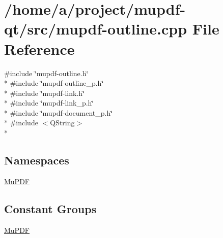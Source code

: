 \hypertarget{mupdf-outline_8cpp}{\section{/home/a/project/mupdf-\/qt/src/mupdf-\/outline.cpp File Reference}
\label{mupdf-outline_8cpp}
}
{\ttfamily \#include \char`\"{}mupdf-\/outline.\-h\char`\"{}}\\*
{\ttfamily \#include \char`\"{}mupdf-\/outline\-\_\-p.\-h\char`\"{}}\\*
{\ttfamily \#include \char`\"{}mupdf-\/link.\-h\char`\"{}}\\*
{\ttfamily \#include \char`\"{}mupdf-\/link\-\_\-p.\-h\char`\"{}}\\*
{\ttfamily \#include \char`\"{}mupdf-\/document\-\_\-p.\-h\char`\"{}}\\*
{\ttfamily \#include $<$Q\-String$>$}\\*
\subsection*{Namespaces}
\begin{DoxyCompactItemize}
\item 
\hyperlink{namespace_mu_p_d_f}{Mu\-P\-D\-F}
\end{DoxyCompactItemize}
\subsection*{Constant Groups}
\begin{DoxyCompactItemize}
\item 
\hyperlink{namespace_mu_p_d_f}{Mu\-P\-D\-F}
\end{DoxyCompactItemize}
